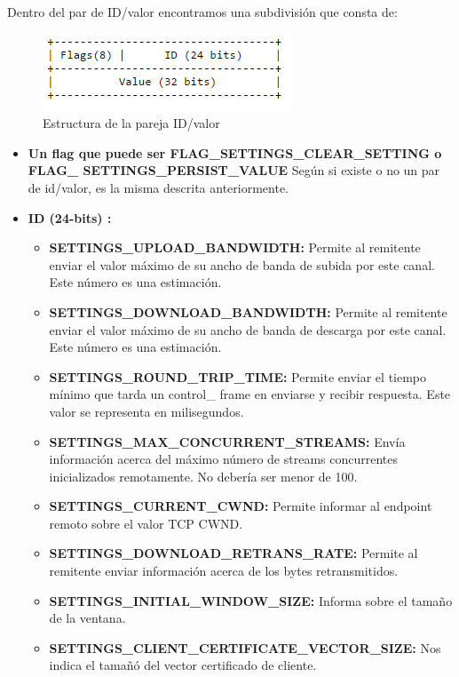 Dentro del par de ID/valor encontramos una subdivisión que consta de:

\begin{figure}[H] %
\includegraphics[scale=1]{settings2.png}  %
\centering
\caption{Estructura de la pareja ID/valor} \label{fig:figura8}
\end{figure}

\begin{itemize}
\item \textbf{Un flag que puede ser FLAG\_SETTINGS\_CLEAR\_SETTING o FLAG\_ SETTINGS\_PERSIST\_VALUE} Según si existe o no un par de id/valor, es la misma descrita anteriormente.
\item \textbf{ID (24-bits) :}
 \begin{itemize}
 \item \textbf{SETTINGS\_UPLOAD\_BANDWIDTH:} Permite al remitente enviar el valor máximo de su ancho de banda de subida por este canal. Este número es una estimación.
 \item \textbf{SETTINGS\_DOWNLOAD\_BANDWIDTH:}  Permite al remitente enviar el valor máximo de su ancho de banda de descarga por este canal. Este número es una estimación.
 \item \textbf{SETTINGS\_ROUND\_TRIP\_TIME:} Permite enviar el tiempo mínimo que tarda un control\_ frame en enviarse y recibir respuesta. Este valor se representa en milisegundos.
 \item \textbf{SETTINGS\_MAX\_CONCURRENT\_STREAMS:}  Envía información acerca del máximo número de streams concurrentes inicializados remotamente. No debería ser menor de 100. 
 \item \textbf{SETTINGS\_CURRENT\_CWND:} Permite informar al endpoint remoto sobre el valor TCP CWND.
 \item \textbf{SETTINGS\_DOWNLOAD\_RETRANS\_RATE:} Permite al remitente enviar información acerca de los bytes retransmitidos.
 \item \textbf{SETTINGS\_INITIAL\_WINDOW\_SIZE:} Informa sobre el tamaño de la ventana.
 \item \textbf{SETTINGS\_CLIENT\_CERTIFICATE\_VECTOR\_SIZE:} Nos indica el tamañó del vector certificado de cliente.
\end{itemize}
\end{itemize}

